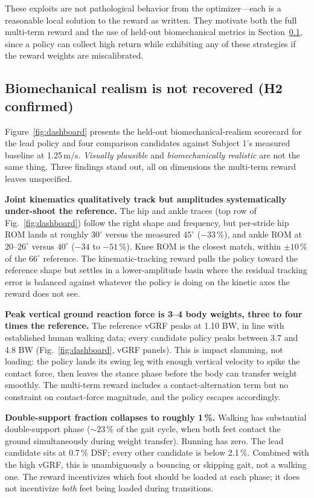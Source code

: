 \documentclass{article}
\begin{document}
These exploits are not pathological behavior from the optimizer---each is a reasonable local solution to the reward as written. They motivate both the full multi-term reward and the use of held-out biomechanical metrics in Section~\ref{sec:results-h2}, since a policy can collect high return while exhibiting any of these strategies if the reward weights are miscalibrated.

\subsection{Biomechanical realism is not recovered (H2 confirmed)}
\label{sec:results-h2}

Figure~\ref{fig:dashboard} presents the held-out biomechanical-realism scorecard for the lead policy and four comparison candidates against Subject 1's measured baseline at 1.25\,m/s. \emph{Visually plausible} and \emph{biomechanically realistic} are not the same thing. Three findings stand out, all on dimensions the multi-term reward leaves unspecified.

\textbf{Joint kinematics qualitatively track but amplitudes systematically under-shoot the reference.} The hip and ankle traces (top row of Fig.~\ref{fig:dashboard}) follow the right shape and frequency, but per-stride hip ROM lands at roughly $30^\circ$ versus the measured $45^\circ$ ($-33$\,\%), and ankle ROM at $20$--$26^\circ$ versus $40^\circ$ ($-34$ to $-51$\,\%). Knee ROM is the closest match, within $\pm 10$\,\% of the $66^\circ$ reference. The kinematic-tracking reward pulls the policy toward the reference shape but settles in a lower-amplitude basin where the residual tracking error is balanced against whatever the policy is doing on the kinetic axes the reward does not see.

\textbf{Peak vertical ground reaction force is 3--4 body weights, three to four times the reference.} The reference vGRF peaks at 1.10 BW, in line with established human walking data; every candidate policy peaks between 3.7 and 4.8 BW (Fig.~\ref{fig:dashboard}, vGRF panels). This is impact slamming, not loading: the policy lands its swing leg with enough vertical velocity to spike the contact force, then leaves the stance phase before the body can transfer weight smoothly. The multi-term reward includes a contact-alternation term but no constraint on contact-force magnitude, and the policy escapes accordingly.

\textbf{Double-support fraction collapses to roughly 1\,\%.} Walking has substantial double-support phase ($\sim 23$\,\% of the gait cycle, when both feet contact the ground simultaneously during weight transfer). Running has zero. The lead candidate sits at 0.7\,\% DSF; every other candidate is below 2.1\,\%. Combined with the high vGRF, this is unambiguously a bouncing or skipping gait, not a walking one. The reward incentivizes which foot should be loaded at each phase; it does not incentivize \emph{both} feet being loaded during transitions.
\end{document}
